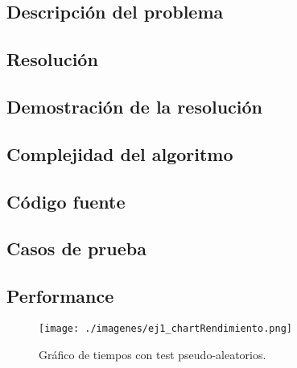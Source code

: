 \subsection{Descripci\'on del problema}

\subsection{Resoluci\'on}


\subsection{Demostraci\'on de la resoluci\'on}


\subsection{Complejidad del algoritmo}


\subsection{C\'odigo fuente}



\subsection{Casos de prueba}


\subsection{Performance}


\begin{figure}[H]
\begin{center}
\texttt{[image: ./imagenes/ej1\_chartRendimiento.png]}
\caption{Gr\'afico de tiempos con test pseudo-aleatorios.}
\end{center}
\end{figure}
